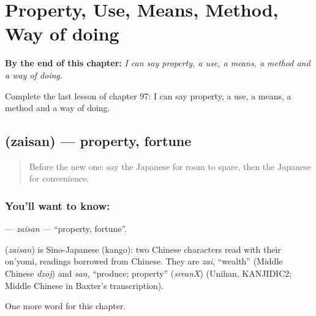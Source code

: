 
\chapter{Property, Use, Means, Method, Way of doing}
\label{ch:ja-property-use-means-method-way-of-doing}

\begin{chapteropening}
\textbf{By the end of this chapter:} \emph{I can say property, a use, a means, a method and a way of doing.}

Complete the last lesson of chapter 97: I can say property, a use, a means, a method and a way of doing.
\end{chapteropening}

\section[\texorpdfstring{\ja{ざいさん} (zaisan)}{ざいさん (zaisan)}]{ (zaisan) — property, fortune}

\label{lesson:JA-C97-zaisan}



\begin{quote}
Before the new one: say the Japanese for room to spare, then the Japanese for convenience.
\end{quote}

\subsection*{You'll want to know: }
\textbf{} — \emph{zaisan} — \textquotedblleft{}property, fortune\textquotedblright{}.

\begin{cousinweb}
\textbf{} (\emph{zaisan}) is Sino-Japanese (kango): two Chinese characters read with their on'yomi, readings borrowed from Chinese. They are \emph{zai}, \textquotedblleft{}wealth\textquotedblright{} (Middle Chinese \emph{dzoj}) and \emph{san}, \textquotedblleft{}produce; property\textquotedblright{} (\emph{sreanX}) (Unihan, KANJIDIC2; Middle Chinese in Baxter's transcription).
\end{cousinweb}

\begin{grammarlens}[title={What you've built}]
One more word for this chapter.
\end{grammarlens}

